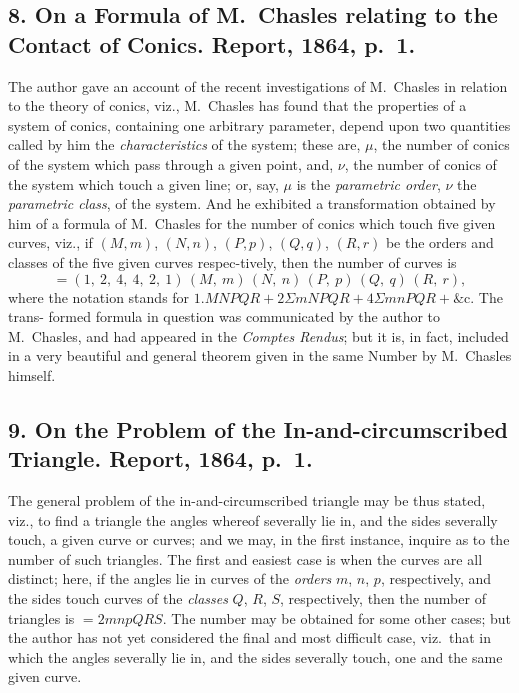 \documentclass[11pt,a4paper]{article}
\begin{document}
\subsection*{8. On a Formula of M.~Chasles relating to the Contact of Conics. Report, 1864, p.~1.}

The author gave an account of the recent investigations of M.~Chasles in relation
to the theory of conics, viz., M.~Chasles has found that the properties of a system
of conics, containing one arbitrary parameter, depend upon two quantities called by
him the \textit{characteristics} of the system; these are, $\mu$, the number of conics of the
system which pass through a given point, and, $\nu$, the number of conics of the system
which touch a given line; or, say, $\mu$ is the \textit{parametric order}, $\nu$ the \textit{parametric class},
of the system. And he exhibited a transformation obtained by him of a formula of
M.~Chasles for the number of conics which touch five given curves, viz., if $(M, m)$,
$(N, n)$, $(P, p)$, $(Q, q)$, $(R, r)$ be the orders and classes of the five given curves respec-\noindent tively, then the number of curves is
\[
=(1,\ 2,\ 4,\ 4,\ 2,\ 1)\,(M,\ m)\,(N,\ n)\,(P,\ p)\,(Q,\ q)\,(R,\ r),
\]
where the notation stands for $1.MNPQR + 2\Sigma mNPQR + 4\Sigma mnPQR + \&$c. The trans-
formed formula in question was communicated by the author to M.~Chasles, and had
appeared in the \textit{Comptes Rendus}; but it is, in fact, included in a very beautiful and
general theorem given in the same Number by M.~Chasles himself.

\subsection*{9. On the Problem of the In-and-circumscribed Triangle. Report, 1864, p.~1.}

The general problem of the in-and-circumscribed triangle may be thus stated, viz.,
to find a triangle the angles whereof severally lie in, and the sides severally touch, a
given curve or curves; and we may, in the first instance, inquire as to the number
of such triangles. The first and easiest case is when the curves are all distinct; here,
if the angles lie in curves of the \textit{orders} $m$, $n$, $p$, respectively, and the sides touch
curves of the \textit{classes} $Q$, $R$, $S$, respectively, then the number of triangles is $=2mnpQRS$.
The number may be obtained for some other cases; but the author has not yet
considered the final and most difficult case, viz.\ that in which the angles severally
lie in, and the sides severally touch, one and the same given curve.
\end{document}
